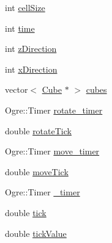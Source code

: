 \begin{DoxyCompactItemize}
\item 
int \hyperlink{classbox_a96f4d4f2e59525807d053b6972a72441}{cell\-Size}
\item 
int \hyperlink{classbox_a68fbb1af7f202fb26fce4dcfe9b62293}{time}
\item 
int \hyperlink{classbox_a4c72d37c31f8bca128ce436b5c5e7f04}{z\-Direction}
\item 
int \hyperlink{classbox_a415ffc44d6f1b1ea7c50b0d07971f017}{x\-Direction}
\item 
vector$<$ \hyperlink{class_cube}{Cube} $\ast$ $>$ \hyperlink{classbox_a53e283c3448f79142666aedfea567b04}{cubes}
\item 
Ogre\-::\-Timer \hyperlink{classbox_abd44104db5f2b13def5813ee20d27dcb}{rotate\-\_\-timer}
\item 
double \hyperlink{classbox_a46d6bfaa2beca404b86a12ac33e849a3}{rotate\-Tick}
\item 
Ogre\-::\-Timer \hyperlink{classbox_a5eaf149a0b9bff3ee5cfd62ad4de1a08}{move\-\_\-timer}
\item 
double \hyperlink{classbox_aa37b652252a99b368309c11eb1647811}{move\-Tick}
\item 
Ogre\-::\-Timer \hyperlink{classbox_aa8731a3a737a73831f093b550e28f4a3}{\-\_\-timer}
\item 
double \hyperlink{classbox_ad2e3d5ed2adf37059cca8c814a45d892}{tick}
\item 
double \hyperlink{classbox_a3259d49a7e78981c7bbe64fe0d5e3e3d}{tick\-Value}
\end{DoxyCompactItemize}


